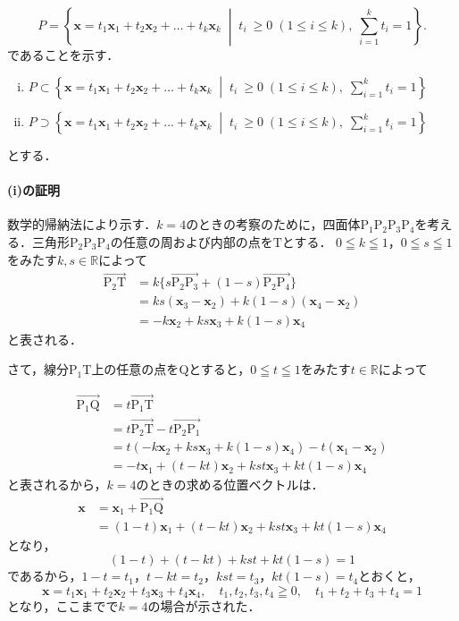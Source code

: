 \begin{tproof}
  \[
    P=\left\{\bm{x}=t_1 \bm{x}_1+t_2\bm{x}_2+\dots+t_k\bm{x}_k\; \middle| \;t_i\ \ge 0\;(1\le i\le k),\;\sum_{i=1}^k t_i=1\right\}.
  \]
  であることを示す．
  \begin{enumerate}[(i)]
    \item $ P \subset \left\{\bm{x}=t_1 \bm{x}_1+t_2\bm{x}_2+\dots+t_k\bm{x}_k\; \middle| \;t_i\ \ge 0\;(1\le i\le k),\;\sum_{i=1}^k t_i=1\right\}$
    \item $ P \supset \left\{\bm{x}=t_1 \bm{x}_1+t_2\bm{x}_2+\dots+t_k\bm{x}_k\; \middle| \;t_i\ \ge 0\;(1\le i\le k),\;\sum_{i=1}^k t_i=1\right\}$
  \end{enumerate}
  とする．
  \paragraph{(i)の証明}
  数学的帰納法により示す．$k=4$のときの考察のために，四面体$\mathrm{P_1 P_2 P_3 P_4}$を考える．三角形$\mathrm{P_2 P_3 P_4}$の任意の周および内部の点を$\mathrm{T}$とする．
  $0 \leqq k \leqq 1$，$0 \leqq s \leqq 1$をみたす$k,s \in \mathbb{R}$によって
  \begin{align*}
    \overrightarrow{\mathrm{P_2 T}} & = k \{ s \overrightarrow{\mathrm{P_2 P_3}} + (1-s) \overrightarrow{\mathrm{P_2 P_4}} \} \\
                                    & = ks(\bm{x}_3 -\bm{x}_2) + k(1-s) (\bm{x}_4-\bm{x}_2)                                   \\
                                    & = -k\bm{x}_2 + ks \bm{x}_3 + k(1-s) \bm{x}_4
  \end{align*}
  と表される．

  さて，線分$\mathrm{P_1 T}$上の任意の点を$\mathrm{Q}$とすると，$0 \leqq t \leqq 1$をみたす$t \in \mathbb{R}$によって

  \begin{align*}
    \overrightarrow{\mathrm{P_1 Q}} & =t \overrightarrow{\mathrm{P_1 T}}                                      \\
                                    & = t\overrightarrow{\mathrm{P_2 T}} - t\overrightarrow{\mathrm{P_2 P_1}} \\
                                    & = t (-k\bm{x}_2 + ks \bm{x}_3 + k(1-s) \bm{x}_4)-t(\bm{x}_1 -\bm{x}_2)  \\
                                    & = -t\bm{x}_1 +(t-kt) \bm{x}_2 + kst \bm{x}_3 +kt(1-s) \bm{x}_4
  \end{align*}
  と表されるから，$k=4$のときの求める位置ベクトルは．
  \begin{align*}
    \bm{x} & = \bm{x}_1 + \overrightarrow{\mathrm{P_1 Q}}                     \\
           & = (1-t) \bm{x}_1 +(t-kt)\bm{x}_2 +kst \bm{x}_3 +kt(1-s) \bm{x}_4
  \end{align*}
  となり，
  \[
    (1-t)+ (t-kt)+kst + kt(1-s)=1
  \]
  であるから，$1-t = t_1$，$t-kt =t_2$，$kst = t_3$，$kt(1-s)=t_4$とおくと，
  \[
    \bm{x}= t_1 \bm{x}_1 + t_2 \bm{x}_2 + t_3 \bm{x}_3 + t_4 \bm{x}_4 , \quad t_1, t_2 ,t_3 , t_4 \geqq 0 ,\quad  t_1 +t_2 + t_3 + t_4 =1
  \]
  となり，ここまでで$k=4$の場合が示された．


\end{tproof}
